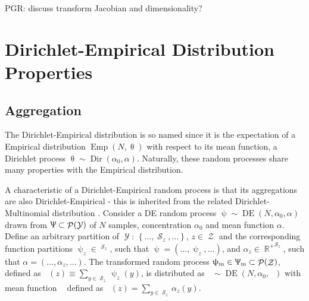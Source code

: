 \documentclass[12pt]{report}
\DeclareMathOperator{\Ycal}{\mathcal{Y}}
\DeclareMathOperator{\Zcal}{\mathcal{Z}}
\DeclareMathOperator{\Scal}{\mathcal{S}}
\DeclareMathOperator{\Pcal}{\mathcal{P}}
\DeclareMathOperator{\Rbb}{\mathbb{R}}
\DeclareMathOperator{\Rbbgeq}{\mathbb{R}_{\geq 0}}
\DeclareMathOperator{\Dir}{\mathrm{Dir}}
\DeclareMathOperator{\Emp}{\mathrm{Emp}}
\DeclareMathOperator{\DE}{\mathrm{DE}}
\DeclareMathOperator{\uppsim}{\uppsi_\text{m}}
\DeclareMathOperator{\Uppsim}{\Uppsi_\text{m}}
\DeclareMathOperator{\alpham}{\alpha_\text{m}}
\begin{document}
PGR: discuss transform Jacobian and dimensionality? 










\section{Dirichlet-Empirical Distribution Properties} 
\label{app:DE}

\subsection{Aggregation}

The Dirichlet-Empirical distribution is so named since it is the expectation of a Empirical distribution $\Emp(N,\uptheta)$ with respect to its mean function, a Dirichlet process $\uptheta \sim \Dir(\alpha_0, \alpha)$. Naturally, these random processes share many properties with the Empirical distribution.

A characteristic of a Dirichlet-Empirical random process is that its aggregations are also Dirichlet-Empirical - this is inherited from the related Dirichlet-Multinomial distribution \cite{johnson}. Consider a DE random process $\uppsi \sim \DE(N,\alpha_0,\alpha)$ drawn from $\Uppsi \subset \Pcal(\Ycal)$ of $N$ samples, concentration $\alpha_0$ and mean function $\alpha$. Define an arbitrary partition of $\Ycal$: $\left\{ \ldots,\Scal_z,\ldots \right\}$, $z \in \Zcal$ and the corresponding function partitions $\uppsi_z \in \Rbbgeq^{\Scal_z}$, such that $\uppsi = \left( \ldots,\uppsi_z,\ldots \right)$, and $\alpha_z \in {\Rbb^+}^{\Scal_z}$, such that $\alpha = \left( \ldots,\alpha_z,\ldots \right)$. The transformed random process $\uppsim \in \Uppsim \subset \Pcal(\Zcal)$, defined as $\uppsim(z) \equiv \sum_{y \in \Scal_z} \uppsi_z(y)$, is distributed as $\uppsim \sim \DE(N,\alpha_0,\alpham)$ with mean function $\alpham$ defined as $\alpham(z) = \sum_{y \in \Scal_z} \alpha_z(y)$.
\end{document}
